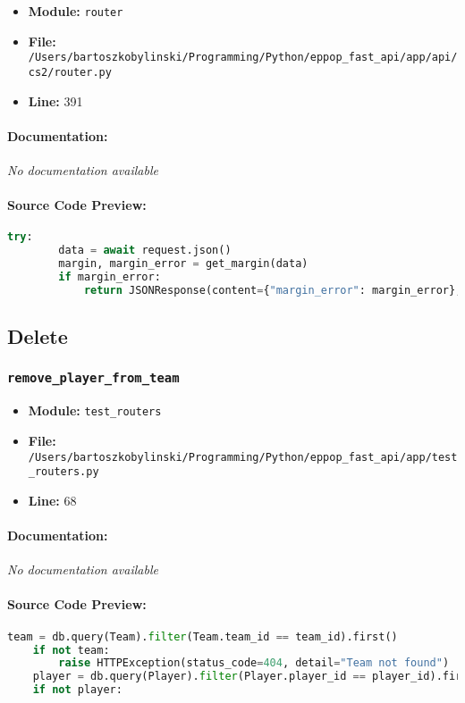\documentclass[11pt,a4paper]{article}
\begin{document}
\begin{itemize}
    \item \textbf{Module:} \texttt{router}
    \item \textbf{File:} \texttt{/Users/bartoszkobylinski/Programming/Python/eppop\_fast\_api/app/api/cs2/router.py}
    \item \textbf{Line:} 391
\end{itemize}

\paragraph{Documentation:} \textit{No documentation available}

\paragraph{Source Code Preview:}
\begin{lstlisting}[language=Python]
    try:
        data = await request.json()
        margin, margin_error = get_margin(data)
        if margin_error:
            return JSONResponse(content={"margin_error": margin_error}, status_code=400)
\end{lstlisting}

\vspace{1em}
\subsection{Delete}

\subsubsection{\texttt{remove\_player\_from\_team}}

\begin{itemize}
    \item \textbf{Module:} \texttt{test\_routers}
    \item \textbf{File:} \texttt{/Users/bartoszkobylinski/Programming/Python/eppop\_fast\_api/app/test\_routers.py}
    \item \textbf{Line:} 68
\end{itemize}

\paragraph{Documentation:} \textit{No documentation available}

\paragraph{Source Code Preview:}
\begin{lstlisting}[language=Python]
    team = db.query(Team).filter(Team.team_id == team_id).first()
    if not team:
        raise HTTPException(status_code=404, detail="Team not found")
    player = db.query(Player).filter(Player.player_id == player_id).first()
    if not player:
\end{lstlisting}
\end{document}
